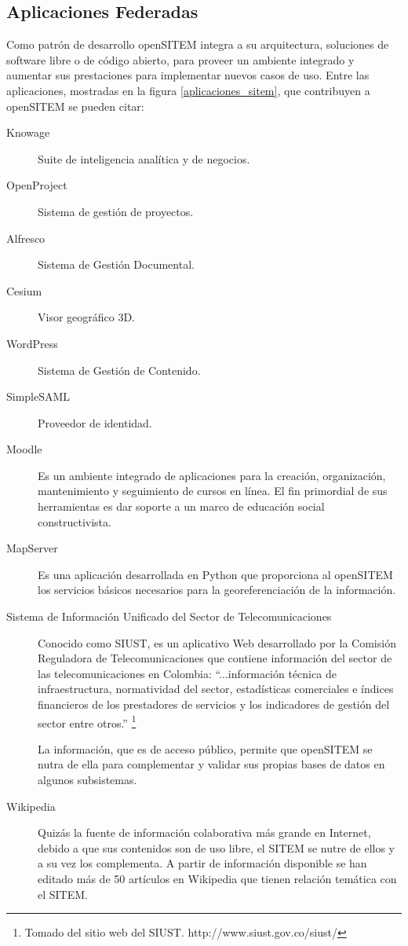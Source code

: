 \subsection{Aplicaciones Federadas} 

Como patrón de desarrollo openSITEM integra a su arquitectura, soluciones de software libre o de código abierto, para proveer un ambiente integrado y aumentar sus prestaciones para implementar nuevos casos de uso. Entre las aplicaciones, mostradas en la figura \ref{aplicaciones_sitem}, que contribuyen a openSITEM se pueden citar:

\begin{description}

\item[Knowage] Suite de inteligencia analítica y de negocios.

\item[OpenProject] Sistema de gestión de proyectos.

\item[Alfresco] Sistema de Gestión Documental.

\item[Cesium] Visor geográfico 3D.

\item[WordPress] Sistema de Gestión de Contenido.

\item[SimpleSAML] Proveedor de identidad.

 \item[Moodle] Es un ambiente integrado de aplicaciones para la creación, organización, mantenimiento y seguimiento de cursos en línea. El fin primordial de sus herramientas es dar soporte a un marco de educación social constructivista.

\item[MapServer] Es una aplicación desarrollada en Python que proporciona al openSITEM los servicios básicos necesarios para la georeferenciación de la información.

\item[Sistema de Información Unificado del Sector de Telecomunicaciones] Conocido como SIUST, es un aplicativo Web desarrollado por la Comisión Reguladora de Telecomunicaciones que contiene información del sector de las telecomunicaciones en Colombia: “...información técnica de infraestructura, normatividad del sector, estadísticas comerciales e índices financieros de los prestadores de servicios y los indicadores de gestión del sector entre otros.” \footnote{Tomado del sitio web del SIUST. http://www.siust.gov.co/siust/}

La información, que es de acceso público, permite que openSITEM se nutra de ella para complementar y validar sus propias bases de datos en algunos subsistemas.

\item[Wikipedia] Quizás la fuente de información colaborativa más grande en Internet, debido a que sus contenidos son de uso libre, el SITEM se nutre de ellos y a su vez los complementa. A partir de información disponible se han editado más de 50 artículos en Wikipedia que tienen relación temática con el SITEM.

 \end{description}

